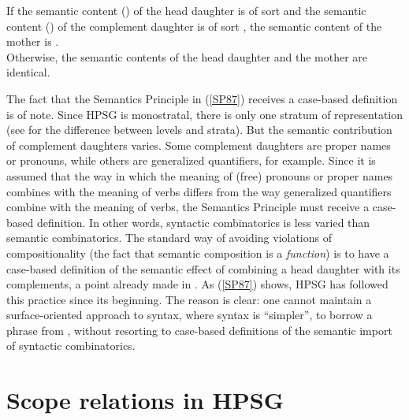 \documentclass[output=paper
	        ,collection
	        ,collectionchapter
 	        ,biblatex
                ,babelshorthands
                ,newtxmath
                ,draftmode
                ,colorlinks, citecolor=brown
]{langscibook}
\begin{document}
\eal \label{SP87}
\ex
If the semantic content () of the head daughter is of sort  and the semantic content () of the complement daughter is of sort , the semantic content of the mother is .\\
\ex Otherwise, the semantic contents of the head daughter and the mother are identical.
\zl


The fact that the Semantics Principle in (\ref{SP87}) receives a case-based definition is of note. Since HPSG is monostratal, there is only one stratum of representation (see \citealt{Ladusaw1988b} for the difference between levels and strata). But the semantic contribution of complement daughters varies. Some complement daughters are proper names or pronouns, while others are generalized quantifiers, for example. Since it is assumed that the way in which the meaning of (free) pronouns or proper names combines with the meaning of verbs  differs from the way generalized quantifiers combine with the meaning of verbs, the Semantics Principle must receive a case-based definition. In other words, syntactic combinatorics is less varied than semantic combinatorics. The standard way of avoiding violations of compositionality (the fact that semantic composition is a \emph{function}) is to have a case-based definition of the semantic effect of combining a head daughter with its complements, a point already made in \citet{Partee1984a}. As (\ref{SP87}) shows, HPSG has followed this practice since its beginning. The reason is clear: one cannot maintain a surface-oriented approach to syntax, where syntax is ``simpler'', to borrow a phrase from \citet{CulicoverandJackendoff2005}, without resorting to case-based definitions of the semantic import of syntactic combinatorics.


\section{Scope relations in HPSG}
\end{document}
